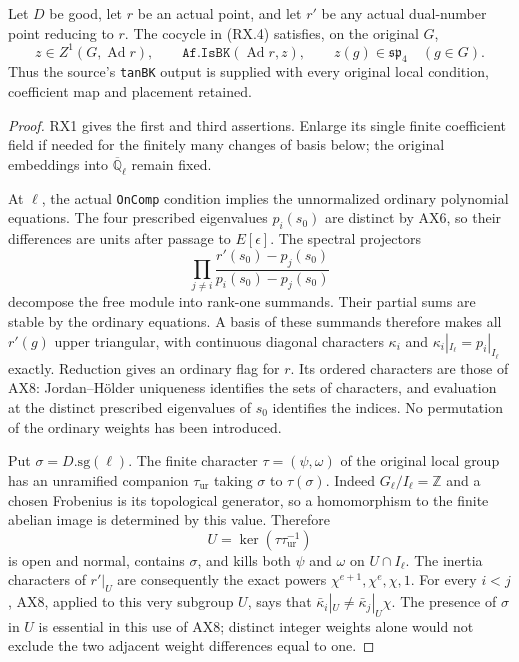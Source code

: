 \begin{proposition}
\label{prop:rx-tanbk}
Let $D$ be good, let $r$ be an actual point, and let $r'$ be any
actual dual-number point reducing to $r$.  The cocycle in (RX.4)
satisfies, on the original $G$,
\[
 z\in Z^1(G,\operatorname{Ad}r),\qquad
 \texttt{Af.IsBK}(\operatorname{Ad}r,z),\qquad
                   z(g)\in\mathfrak{sp}_4\quad(g\in G).
 \tag{RX.13}
\]
Thus the source's \texttt{tanBK} output is supplied with every
original local condition, coefficient map and placement retained.
\end{proposition}

\begin{proof}
RX1 gives the first and third assertions.  Enlarge its single finite
coefficient field if needed for the finitely many changes of basis
below; the original embeddings into $\overline{\mathbb Q}_\ell$ remain
fixed.

At $\ell$, the actual \texttt{OnComp} condition implies the
unnormalized ordinary polynomial equations.  The four prescribed
eigenvalues $p_i(s_0)$ are distinct by AX6, so their differences are
units after passage to $E[\epsilon]$.
The spectral projectors
\[
        \prod_{j\ne i}
           \frac{r'(s_0)-p_j(s_0)}{p_i(s_0)-p_j(s_0)}
 \tag{RX.14}
\]
decompose the free module into rank-one summands.  Their partial sums
are stable by the ordinary equations.  A basis of these summands
therefore makes all $r'(g)$ upper triangular, with continuous
diagonal characters $\kappa_i$ and
$\kappa_i|_{I_\ell}=p_i|_{I_\ell}$ exactly.
Reduction gives an ordinary flag for $r$.  Its ordered characters
are those of AX8: Jordan--H\"older uniqueness identifies the sets of
characters, and evaluation at the distinct prescribed eigenvalues
of $s_0$ identifies the indices.  No permutation of the ordinary
weights has been introduced.

Put $\sigma=D.\mathrm{sg}(\ell)$.
The finite character $\tau=(\psi,\omega)$ of the original local
group has an unramified companion $\tau_{\mathrm{ur}}$ taking
$\sigma$ to $\tau(\sigma)$.  Indeed
$G_\ell/I_\ell=\widehat{\mathbb Z}$ and a chosen Frobenius is its
topological generator, so a homomorphism to the finite abelian image
is determined by this value.  Therefore
\[
 U=\ker(\tau\tau_{\mathrm{ur}}^{-1})
 \tag{RX.15}
\]
is open and normal, contains $\sigma$, and kills both $\psi$ and
$\omega$ on $U\cap I_\ell$.
The inertia characters of $r'|_U$ are consequently the exact powers
$\chi^{e+1},\chi^e,\chi,1$.
For every $i<j$, AX8, applied to this very subgroup $U$, says that
$\bar\kappa_i|_U\ne\bar\kappa_j|_U\chi$.
The presence of $\sigma$ in $U$ is essential in this use of AX8;
distinct integer weights alone would not exclude the two adjacent
weight differences equal to one.


\end{proof}
